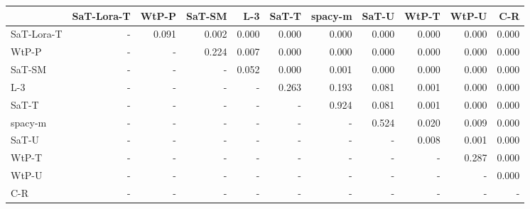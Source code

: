 \begin{tabular}{lrrrrrrrrrr}
\toprule
 & SaT-Lora-T & WtP-P & SaT-SM & L-3 & SaT-T & spacy-m & SaT-U & WtP-T & WtP-U & C-R \\
\midrule
SaT-Lora-T & - & 0.091 & 0.002 & 0.000 & 0.000 & 0.000 & 0.000 & 0.000 & 0.000 & 0.000 \\
WtP-P & - & - & 0.224 & 0.007 & 0.000 & 0.000 & 0.000 & 0.000 & 0.000 & 0.000 \\
SaT-SM & - & - & - & 0.052 & 0.000 & 0.001 & 0.000 & 0.000 & 0.000 & 0.000 \\
L-3 & - & - & - & - & 0.263 & 0.193 & 0.081 & 0.001 & 0.000 & 0.000 \\
SaT-T & - & - & - & - & - & 0.924 & 0.081 & 0.001 & 0.000 & 0.000 \\
spacy-m & - & - & - & - & - & - & 0.524 & 0.020 & 0.009 & 0.000 \\
SaT-U & - & - & - & - & - & - & - & 0.008 & 0.001 & 0.000 \\
WtP-T & - & - & - & - & - & - & - & - & 0.287 & 0.000 \\
WtP-U & - & - & - & - & - & - & - & - & - & 0.000 \\
C-R & - & - & - & - & - & - & - & - & - & - \\
\bottomrule
\end{tabular}


